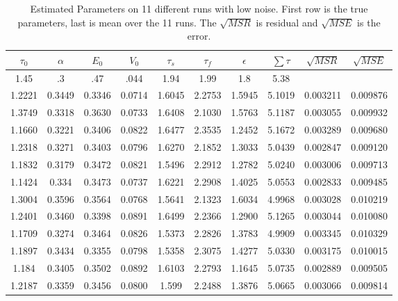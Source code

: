 \begin{table}[t]
\centering
\begin{tabular}{|c | c | c | c | c | c | c | c | c | c |}
\hline 
$\tau_0$ & $\alpha$ & $E_0$    & $V_0$    & $\tau_s$ & $\tau_f$ & $\epsilon$  & $ \sum \tau $ & $\sqrt{MSR}$ &$\sqrt{MSE}$\\
\hline 
\rowcolor[gray]{.8}
1.45 & .3 & .47 & .044 & 1.94 & 1.99 & 1.8  & 5.38 &  & \\
\hline 
\hline 
1.2221 & 0.3449 & 0.3346 & 0.0714 & 1.6045 & 2.2753 & 1.5945 & 5.1019 &  0.003211  & 0.009876  \\
1.3749 & 0.3318 & 0.3630 & 0.0733 & 1.6408 & 2.1030 & 1.5763 & 5.1187 &  0.003055  & 0.009932  \\
1.1660 & 0.3221 & 0.3406 & 0.0822 & 1.6477 & 2.3535 & 1.2452 & 5.1672 &  0.003289  & 0.009680  \\
1.2318 & 0.3271 & 0.3403 & 0.0796 & 1.6270 & 2.1852 & 1.3033 & 5.0439 &  0.002847  & 0.009120  \\
1.1832 & 0.3179 & 0.3472 & 0.0821 & 1.5496 & 2.2912 & 1.2782 & 5.0240 &  0.003006  & 0.009713  \\
1.1424 & 0.334  & 0.3473 & 0.0737 & 1.6221 & 2.2908 & 1.4025 & 5.0553 &  0.002833  & 0.009485  \\
1.3004 & 0.3596 & 0.3564 & 0.0768 & 1.5641 & 2.1323 & 1.6034 & 4.9968 &  0.003028  & 0.010219  \\
1.2401 & 0.3460 & 0.3398 & 0.0891 & 1.6499 & 2.2366 & 1.2900 & 5.1265 &  0.003044  & 0.010080  \\
1.1709 & 0.3274 & 0.3464 & 0.0826 & 1.5373 & 2.2826 & 1.3783 & 4.9909 &  0.003345  & 0.010329  \\
1.1897 & 0.3434 & 0.3355 & 0.0798 & 1.5358 & 2.3075 & 1.4277 & 5.0330 &  0.003175  & 0.010015  \\
1.184 &  0.3405 & 0.3502 & 0.0892 & 1.6103 & 2.2793 & 1.1645 & 5.0735 &  0.002889  & 0.009505  \\
\hline                                                                           
1.2187 & 0.3359 & 0.3456 & 0.0800 & 1.599 & 2.2488 & 1.3876 & 5.0665 & 0.003066     & 0.009814 \\
\hline 
\end{tabular}
\caption{Estimated Parameters on 11 different runs with low noise. First row is the true parameters,
last is mean over the 11 runs. The $\sqrt{MSR}$ is residual and $\sqrt{MSE}$ is the error.}
\label{tab:LowNoiseResults} 
\end{table}

